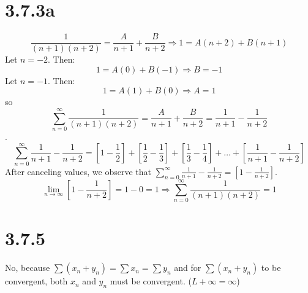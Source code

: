 \documentclass[11pt]{article}
\begin{document}
\section*{3.7.3a}
\[\frac{1}{(n+1)(n+2)}=\frac{A}{n+1}+\frac{B}{n+2}\Rightarrow 1 = A(n+2) + B(n+1)\]
Let $n=-2$. Then:
\[1=A(0)+B(-1) \Rightarrow B=-1\]
Let $n=-1$. Then:
\[1=A(1)+B(0)\Rightarrow A=1\]
so $$\sum_{n=0}^{\infty} \frac{1}{(n+1)(n+2)}=\frac{A}{n+1}+\frac{B}{n+2}=\frac{1}{n+1}-\frac{1}{n+2}$$.
\[\sum_{n=0}^{\infty}\frac{1}{n+1}-\frac{1}{n+2}=\left[1-\frac{1}{2}\right]+\left[\frac{1}{2}-\frac{1}{3}\right]+\left[\frac{1}{3}-\frac{1}{4}\right]+\ldots+\left[\frac{1}{n+1}-\frac{1}{n+2}\right]\]
After canceling values, we observe that $\sum_{n=0}^{\infty}\frac{1}{n+1}-\frac{1}{n+2}=\left[1-\frac{1}{n+2}\right]$.
\[\lim_{n\to\infty}\left[1-\frac{1}{n+2}\right]=1-0=1 \Rightarrow \sum_{n=0}^{\infty}\frac{1}{(n+1)(n+2)}=1\]

\section*{3.7.5}
No, because $\sum(x_n+y_n)=\sum x_n = \sum y_n$ and for $\sum(x_n+y_n)$ to be convergent, both $x_n$ and $y_n$ must be convergent. ($L + \infty = \infty$)
\end{document}
